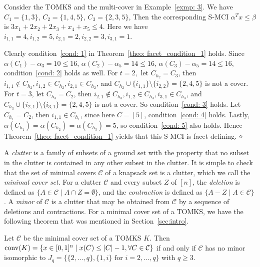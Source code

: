 \begin{example}
Consider the TOMKS and the multi-cover in Example~\ref{exmp: 3}.
We have $C_1 = \{1, 3\}$, $C_2 = \{1, 4, 5\}$, $C_3 = \{2, 3, 5\}$, Then the corresponding S-MCI $\alpha^T x \leq \beta$ is $3x_1 + 2x_2 + 2x_3 + x_4 + x_5 \leq 4$. Here we have $i_{1,1} = 4, i_{1,2} = 5, i_{2,1} = 2, i_{2,2} = 3, i_{3,1} = 1$. 

Clearly condition~\ref{cond: 1} in Theorem~\ref{theo: facet_condition_1} holds.
Since $\alpha(C_1) - \alpha_3 = 10 \leq 16$, $\alpha(C_2) - \alpha_5 = 14 \leq 16$, $\alpha(C_3) - \alpha_5 = 14 \leq 16$, condition~\ref{cond: 2} holds as well.
For $t = 2,$ let $C_{h_2} = C_3$, then $i_{1,1} \notin C_{h_2}, i_{1,2} \in C_{h_2}, i_{2,1} \in C_{h_2}$, and $C_{h_2} \cup \{i_{1,1}\} \setminus \{i_{2,2}\} = \{2, 4, 5\}$ is not a cover. For $t = 3$, let $C_{h_3} = C_2$, then $i_{2,1} \notin C_{h_3}, i_{1,2} \in C_{h_3}, i_{3,1} \in C_{h_3}$, and $C_{h_3} \cup \{i_{2,1}\} \setminus \{i_{3,1}\} = \{2,4,5\}$ is not a cover. So condition~\ref{cond: 3} holds.
Let $C_{h_1} = C_2$, then $i_{1,1} \in C_{h_1}$, since here $C = [5]$, condition~\ref{cond: 4} holds.
Lastly, $\alpha(C_{h_1}) = \alpha(C_{h_2}) = \alpha(C_{h_3}) = 5$, so condition~\ref{cond: 5} also holds. 
Hence Theorem~\ref{theo: facet_condition_1} yields that this S-MCI is facet-defining.
$\hfill \diamond$
\end{example}


A \emph{clutter} is a family of subsets of a ground set with the property that no subset in the clutter is contained in any other subset in the clutter. 
It is simple to check that the set of minimal covers $\mathcal C$ of a knapsack set is a clutter, which we call the \emph{minimal cover set}. 
For a clutter $\mathcal C$ and every subset $Z$ of $[n]$, the \emph{deletion}
is defined as $\{A \in \mathcal C \mid A \cap Z =\emptyset\}$, and the \emph{contraction}
is defined as $\{A-Z \mid A \in \mathcal C\}$. 
A \emph{minor} of $\mathcal C$ is a clutter that may be obtained from $\mathcal C$ by a sequence of deletions and contractions. 
For a minimal cover set of a TOMKS, 
we have the following theorem that was mentioned in Section~\ref{sec:intro}.

\begin{theorem}
\label{theo: cover_clutter}
Let $\mathcal C$ be the minimal cover set of a TOMKS $K$. Then $\operatorname{conv}(K) = \{x \in [0,1]^n \mid x(C) \leq |C|-1, \forall C \in \mathcal C\}$ if and only if $\mathcal C$ has no minor isomorphic to $J_q = \{\{2,\ldots, q\}, \{1,i\} \text{ for }  i = 2, \ldots, q\}$ with $ q \geq 3.$
\end{theorem}

